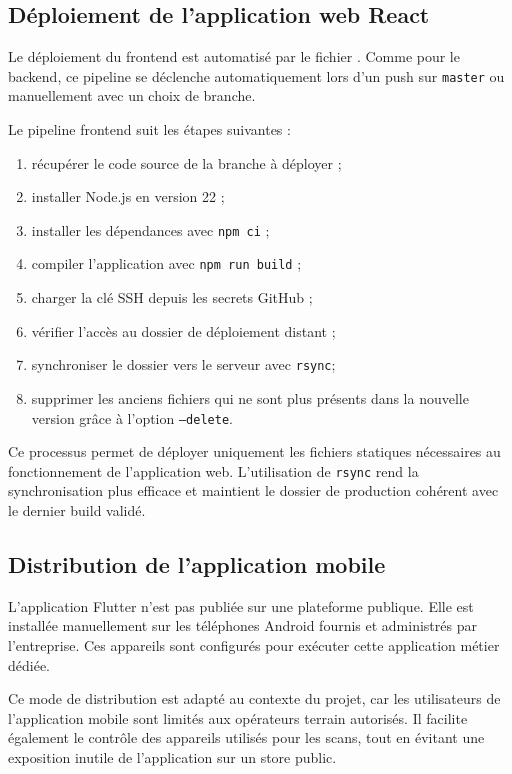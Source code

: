 \subsection*{Déploiement de l'application web React}

Le déploiement du frontend est automatisé par le fichier . Comme pour le backend, ce pipeline se déclenche automatiquement lors d'un push sur \texttt{master} ou manuellement avec un choix de branche.

Le pipeline frontend suit les étapes suivantes :

\begin{enumerate}
    \item récupérer le code source de la branche à déployer ;
    \item installer Node.js en version 22 ;
    \item installer les dépendances avec \texttt{npm ci} ;
    \item compiler l'application avec \texttt{npm run build} ;
    \item charger la clé SSH depuis les secrets GitHub ;
    \item vérifier l'accès au dossier de déploiement distant ;
    \item synchroniser le dossier  vers le serveur avec \texttt{rsync};
    \item supprimer les anciens fichiers qui ne sont plus présents dans la nouvelle version grâce à l'option \texttt{--delete}.
\end{enumerate}

Ce processus permet de déployer uniquement les fichiers statiques nécessaires au fonctionnement de l'application web. L'utilisation de \texttt{rsync} rend la synchronisation plus efficace et maintient le dossier de production cohérent avec le dernier build validé.

\subsection*{Distribution de l'application mobile}

L'application Flutter n'est pas publiée sur une plateforme publique. Elle est installée manuellement sur les téléphones Android fournis et administrés par l'entreprise. Ces appareils sont configurés pour exécuter cette application métier dédiée.

Ce mode de distribution est adapté au contexte du projet, car les utilisateurs de l'application mobile sont limités aux opérateurs terrain autorisés. Il facilite également le contrôle des appareils utilisés pour les scans, tout en évitant une exposition inutile de l'application sur un store public.

